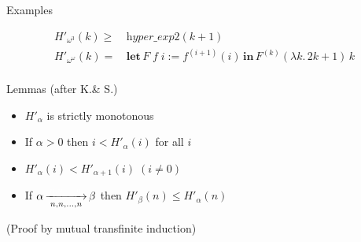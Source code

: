 \documentclass[10pt, fleqn]{beamer}
\begin{document}


\begin{frame}[fragile]
  \begin{block}{Examples}
         
      {\color{mathcolor}
      
    \begin{align*}
      H'_{\omega^3}(k) \geq\, & \textit{hyper\_exp2}(k+1) \\
      H'_{\omega^\omega}(k)=\,& \textbf{let}\,F\;f\;i := f^{(i+1)}(i)\,
                      \textbf{in}\, F^{(k)}(\lambda k.\,2k+1)\,k\\
    \end{align*}
       }%
  \end{block}
  

\begin{block}{Lemmas (after K.\& S.)}
   \begin{itemize} 
    \item \textcolor{mathcolor}{$H'_\alpha$} is strictly monotonous
    
     \item  If $\alpha>0$ then \textcolor{mathcolor}{$ i < H'_\alpha(i)$} for all $i$
    
    \item   $H'_\alpha(i) < H'_{\alpha+1}(i) \; (i \not=0)$
    
       \item     If \textcolor{mathcolor}{$\alpha \rplus{n,n,\dots,n} \beta$} then \textcolor{mathcolor}{$H'_\beta(n)\leq H'_\alpha(n)$} 
         

       \end{itemize}
       (Proof by mutual transfinite induction)
 \end{block}  
  
    
\end{frame}
 



\end{document}
